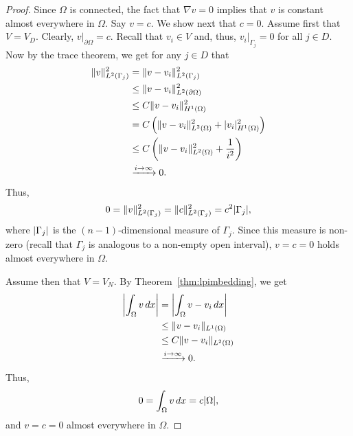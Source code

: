 \documentclass[english, 12pt, a4paper, sci, utf8, a-2b, online]{aaltothesis}
\theoremstyle{definition}
\theoremstyle{plain}
\DeclarePairedDelimiter\abs{\lvert}{\rvert}
\DeclarePairedDelimiter\norm{\lVert}{\rVert}
\newcommand*\diff{\mathop{}\!d}
\numberwithin{equation}{section}
\begin{document}
\begin{proof}
    Since $\Omega$ is connected, the fact that $\nabla v = 0$ implies
    that $v$ is constant almost everywhere in $\Omega$. Say $v = c$.
    We show next that $c = 0$. Assume first that $V = V_D$. 
    Clearly, $v|_{\partial \Omega} = c$.
    Recall that $v_i \in V$ and, thus, $v_i|_{\Gamma_j} = 0$ for all $j \in D$.
    Now by the trace theorem, we get for any $j \in D$ that
    \begin{align*}
        \norm{v}_{L^2(\Gamma_j)}^2
        &= \norm{v - v_i}_{L^2(\Gamma_j)}^2 \\
        &\leq \norm{v - v_i}_{L^2(\partial \Omega)}^2 \\
        &\leq C \norm{v - v_i}_{H^1(\Omega)}^2 \\
        &= C \left(\norm{v - v_i}_{L^2(\Omega)}^2
            + \abs{v_i}_{H^1(\Omega)}^2 \right) \\
        &\leq C \left(\norm{v - v_i}_{L^2(\Omega)}^2
            + \frac{1}{i^2} \right) \\
        &\xrightarrow[]{i \to \infty} 0.
    \end{align*}
    Thus,
    \begin{equation*}
        0
        = \norm{v}_{L^2(\Gamma_j)}^2
        = \norm{c}_{L^2(\Gamma_j)}^2
        = c^2 \abs{\Gamma_j},
    \end{equation*}
    where $\abs{\Gamma_j}$ is the $(n-1)$-dimensional measure of $\Gamma_j$.
    Since this measure is non-zero
    (recall that $\Gamma_j$ is analogous to a non-empty open interval),
    $v=c=0$ holds almost everywhere in $\Omega$.

    Assume then that $V = V_N$. By Theorem~\ref{thm:lpimbedding}, we get
    \begin{align*}
        \abs*{\int_{\Omega} v \diff x}
        &= \abs*{\int_{\Omega} v - v_i \diff x} \\
        &\leq \norm{v - v_i}_{L^1(\Omega)} \\
        &\leq C \norm{v - v_i}_{L^2(\Omega)} \\
        &\xrightarrow[]{i \to \infty} 0.
    \end{align*}
    Thus,
    \begin{equation*}
        0
        = \int_{\Omega} v \diff x
        = c \abs{\Omega},
    \end{equation*}
    and $v=c=0$ almost everywhere in $\Omega$.


\end{proof}
\end{document}
